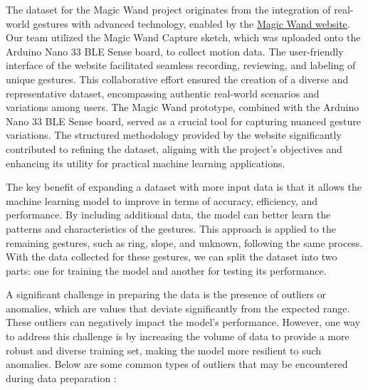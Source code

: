 \begin{enumerate}
	The dataset for the Magic Wand project originates from the integration of real-world gestures with advanced technology, enabled by the \href{https://tinyml.seas.harvard.edu/magic_wand/}{Magic Wand website}. Our team utilized the Magic Wand Capture sketch, which was uploaded onto the Arduino Nano 33 BLE Sense board, to collect motion data. The user-friendly interface of the website facilitated seamless recording, reviewing, and labeling of unique gestures. This collaborative effort ensured the creation of a diverse and representative dataset, encompassing authentic real-world scenarios and variations among users. The Magic Wand prototype, combined with the Arduino Nano 33 BLE Sense board, served as a crucial tool for capturing nuanced gesture variations. The structured methodology provided by the website significantly contributed to refining the dataset, aligning with the project's objectives and enhancing its utility for practical machine learning applications.
	
\end{enumerate}

The key benefit of expanding a dataset with more input data is that it allows the machine learning model to improve in terms of accuracy, efficiency, and performance. By including additional data, the model can better learn the patterns and characteristics of the gestures. This approach is applied to the remaining gestures, such as ring, slope, and unknown, following the same process. With the data collected for these gestures, we can split the dataset into two parts: one for training the model and another for testing its performance.

A significant challenge in preparing the data is the presence of outliers or anomalies, which are values that deviate significantly from the expected range. These outliers can negatively impact the model's performance. However, one way to address this challenge is by increasing the volume of data to provide a more robust and diverse training set, making the model more resilient to such anomalies. Below are some common types of outliers that may be encountered during data preparation \cite{Munoz:2019}:

